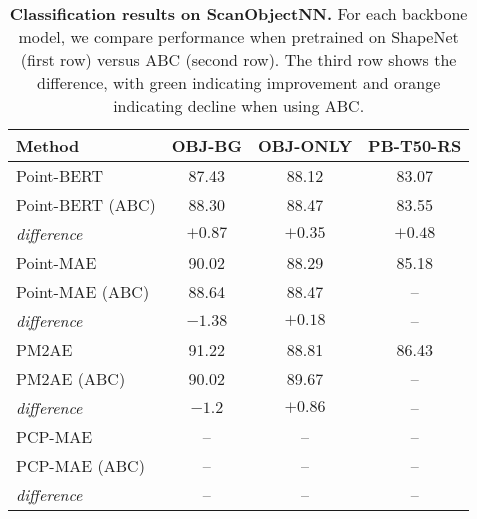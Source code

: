 \begin{table}
\begin{center}
\begin{tabular}{l|ccc}
    
\toprule
Method & OBJ-BG & OBJ-ONLY & PB-T50-RS \\
\midrule

Point-BERT~\cite{pbert} & 87.43 & 88.12 & 83.07\\
Point-BERT (ABC) & 88.30 & 88.47 & 83.55 \\
\textit{difference} & \cellcolor{green!25}$+0.87$ & \cellcolor{green!25}$+0.35$ & \cellcolor{green!25}$+0.48$ \\
\midrule
Point-MAE~\cite{pmae} & 90.02 & 88.29 & 85.18 \\
Point-MAE (ABC) & 88.64 & 88.47 & --\\
\textit{difference} & \cellcolor{orange!25}$-1.38$ & \cellcolor{green!25}$+0.18$ & --\\
\midrule
PM2AE~\cite{pm2ae} & 91.22 & 88.81 & 86.43 \\
PM2AE (ABC) & 90.02 & 89.67 & -- \\
\textit{difference} & \cellcolor{orange!25}$-1.2$ & \cellcolor{green!25}$+0.86$ & -- \\
\midrule
PCP-MAE~\cite{pcpmae} & -- & -- & -- \\
PCP-MAE (ABC) & -- & -- & -- \\
\textit{difference} & -- & -- & -- \\

\bottomrule
\end{tabular}
\caption{{\bf Classification results on ScanObjectNN.} For each backbone model, we compare performance when pretrained on ShapeNet (first row) versus ABC (second row). The third row shows the difference, with green indicating improvement and orange indicating decline when using ABC.}
\setlength\tabcolsep{2pt}
\label{tb:scanobject}
\end{center}

\end{table}